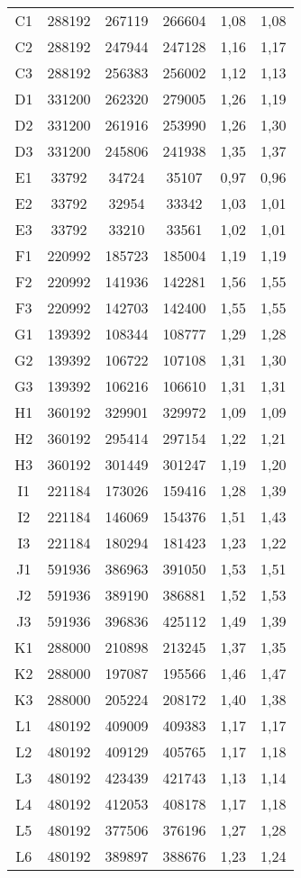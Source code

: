 \begin{center}
\begin{longtable}{cccccc}
    C1    & 288192 & 267119 & 266604 & 1,08  & 1,08 \\
    C2    & 288192 & 247944 & 247128 & 1,16  & 1,17 \\
    C3    & 288192 & 256383 & 256002 & 1,12  & 1,13 \\
    D1    & 331200 & 262320 & 279005 & 1,26  & 1,19 \\
    D2    & 331200 & 261916 & 253990 & 1,26  & 1,30 \\
    D3    & 331200 & 245806 & 241938 & 1,35  & 1,37 \\
    E1    & 33792 & 34724 & 35107 & 0,97  & 0,96 \\
    E2    & 33792 & 32954 & 33342 & 1,03  & 1,01 \\
    E3    & 33792 & 33210 & 33561 & 1,02  & 1,01 \\
    F1    & 220992 & 185723 & 185004 & 1,19  & 1,19 \\
    F2    & 220992 & 141936 & 142281 & 1,56  & 1,55 \\
    F3    & 220992 & 142703 & 142400 & 1,55  & 1,55 \\
    G1    & 139392 & 108344 & 108777 & 1,29  & 1,28 \\
    G2    & 139392 & 106722 & 107108 & 1,31  & 1,30 \\
    G3    & 139392 & 106216 & 106610 & 1,31  & 1,31 \\
    H1    & 360192 & 329901 & 329972 & 1,09  & 1,09 \\
    H2    & 360192 & 295414 & 297154 & 1,22  & 1,21 \\
    H3    & 360192 & 301449 & 301247 & 1,19  & 1,20 \\
    I1    & 221184 & 173026 & 159416 & 1,28  & 1,39 \\
    I2    & 221184 & 146069 & 154376 & 1,51  & 1,43 \\
    I3    & 221184 & 180294 & 181423 & 1,23  & 1,22 \\
    J1    & 591936 & 386963 & 391050 & 1,53  & 1,51 \\
    J2    & 591936 & 389190 & 386881 & 1,52  & 1,53 \\
    J3    & 591936 & 396836 & 425112 & 1,49  & 1,39 \\
    K1    & 288000 & 210898 & 213245 & 1,37  & 1,35 \\
    K2    & 288000 & 197087 & 195566 & 1,46  & 1,47 \\
    K3    & 288000 & 205224 & 208172 & 1,40  & 1,38 \\
    L1    & 480192 & 409009 & 409383 & 1,17  & 1,17 \\
    L2    & 480192 & 409129 & 405765 & 1,17  & 1,18 \\
    L3    & 480192 & 423439 & 421743 & 1,13  & 1,14 \\
    L4    & 480192 & 412053 & 408178 & 1,17  & 1,18 \\
    L5    & 480192 & 377506 & 376196 & 1,27  & 1,28 \\
    L6    & 480192 & 389897 & 388676 & 1,23  & 1,24 \\
\end{longtable}
\end{center}

